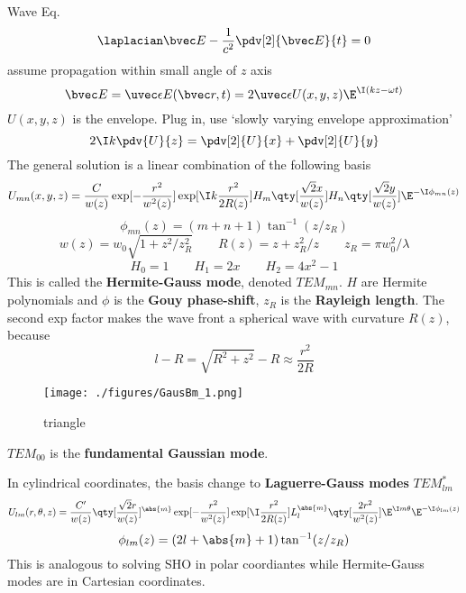 
Wave Eq.
\begin{equation}
\laplacian \bvec E - \frac{1}{c^2} \pdv[2]{\bvec E}{t} = 0
\end{equation}
assume propagation within small angle of $z$ axis
\begin{equation}
\bvec E = \uvec \epsilon E(\bvec r, t) = 2\uvec \epsilon U(x, y, z) \E^{\I (kz - \omega t)}
\end{equation}
$U(x, y, z)$ is the envelope. Plug in, use ‘slowly varying envelope approximation’
\begin{equation}
2\I k\pdv{U}{z} = \pdv[2]{U}{x} + \pdv[2]{U}{y}
\end{equation}
The general solution is a linear combination of the following basis
\begin{equation}
U_{mn}(x, y, z) = \frac{C}{w(z)} \exp[-\frac{r^2}{w^2(z)}]\exp[\I k\frac{r^2}{2R(z)}] H_m\qty[\frac{\sqrt{2}x}{w(z)}] H_n \qty[\frac{\sqrt{2} y}{w(z)}] \E^{-\I \phi_{mn}(z)}
\end{equation}
\begin{equation}
\phi_{mn}(z) = (m+n+1)\tan^{-1}(z/z_R)
\end{equation}
\begin{equation}
w(z) = w_0\sqrt{1 + z^2/z_R^2}
\qquad
R(z) = z + z_R^2 / z
\qquad
z_R = \pi w_0^2 / \lambda
\end{equation}
\begin{equation}
H_0 = 1 \qquad H_1 = 2x \qquad H_2 = 4x^2 - 1
\end{equation}
This is called the \textbf{Hermite-Gauss mode}, denoted $TEM_{mn}$. $H$ are Hermite polynomials and $\phi$ is the \textbf{Gouy phase-shift}, $z_R$ is the \textbf{Rayleigh length}. The second exp factor makes the wave front a spherical wave with curvature $R(z)$, because
\begin{equation}
l - R = \sqrt{R^2 + z^2} - R \approx \frac{r^2}{2R}
\end{equation}

\begin{figure}[ht]
\centering
\texttt{[image: ./figures/GausBm\_1.png]}
\caption{triangle} \label{GausBm_fig1}
\end{figure}

$TEM_{00}$ is the \textbf{fundamental Gaussian mode}.

In cylindrical coordinates, the basis change to \textbf{Laguerre-Gauss modes} $TEM_{lm}^*$
\begin{equation}
U_{lm}(r, \theta, z) = \frac{C'}{w(z)} \qty[\frac{\sqrt{2}r}{w(z)}]^{\abs{m}} \exp[-\frac{r^2}{w^2(z)}] \exp[\I \frac{r^2}{2R(z)}] L_l^{\abs{m}} \qty[\frac{2r^2}{w^2(z)}] \E^{\I m\theta} \E^{-\I \phi_{lm}(z)}
\end{equation}
\begin{equation}
\phi_{lm}(z) = (2l + \abs{m} + 1) \tan^{-1} (z/z_R)
\end{equation}
This is analogous to solving SHO in polar coordiantes while Hermite-Gauss modes are in Cartesian coordinates. 
